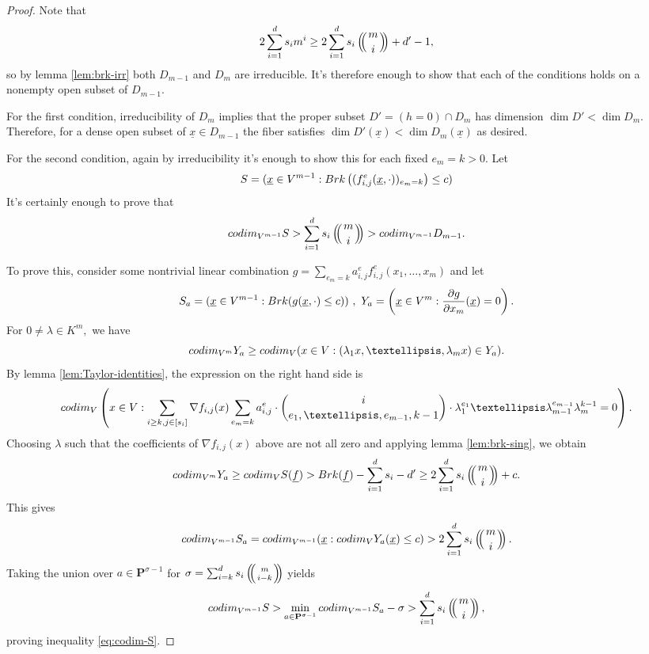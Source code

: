 \documentclass[10pt,a4paper]{amsart}
\let\ul\underline
\theoremstyle{definition}
\def\multiset#1#2{\ensuremath{\left(\kern-.3em\left(\genfrac{}{}{0pt}{}{#1}{#2}\right)\kern-.3em\right)}}
\renewcommand{\P}{\mathbf{P}}
\newcommand{\codim}{\textnormal{codim}}
\newcommand{\brk}{\textnormal{Brk}}
\begin{document}
\begin{proof}
    Note that 
    \[
    2\sum_{i=1}^d s_i m^i \ge 2\sum_{i=1}^d s_i\multiset{m}{i} + d'-1,
    \]
    so by lemma \ref{lem:brk-irr} both $D_{m-1}$ and $D_m$ are irreducible. It's therefore enough to show that each of the conditions holds on a nonempty open subset of $D_{m-1}.$
    
    For the first condition, irreducibility of $D_m$ implies that the proper subset $D' = (h = 0)\cap D_m$ has dimension $\dim D' < \dim D_m.$ Therefore, for a dense open subset of $\ul{x}\in D_{m-1}$ the fiber satisfies $\dim D'(\ul{x}) <\dim D_m(\ul{x})$ as desired. 
    
    For the second condition, again by irreducibility it's enough to show this for each fixed $e_m = k>0.$ Let 
    \[
    S = (\ul{x}\in V^{m-1}: \brk \left((f_{i,j}^e(\ul{x},\cdot))_{e_m = k} \right) \le c)
    \]
    It's certainly enough to prove that
    \begin{equation}\label{eq:codim-S}
        \codim_{V^{m-1}} S > \sum_{i=1}^d s_i \multiset{m}{i} > \codim_{V^{m-1}} D_{m-1}.
    \end{equation}
    
    To prove this, consider some nontrivial linear combination $g = \sum_{e_m = k} a_{i,j}^e f_{i,j}^e(x_1,\ldots,x_m)$ and let
    $$S_a = (\ul{x}\in V^{m-1}: \brk(g(\ul{x},\cdot) \le c))\ ,\ Y_a = \left( \ul{x}\in V^m : \frac{\partial g}{\partial x_m} (\ul{x}) = 0 \right).$$
    For $ 0 \neq \lambda\in K^m,$ we have
    \[
    \codim_{V^m} Y_a \ge \codim_V (x\in V:(\lambda_1x,\ldots,\lambda_m x) \in Y_a). 
    \]
    By lemma \ref{lem:Taylor-identities}, the expression on the right hand side is
    \[
    \codim_V \left( x\in V:  \sum_{i\ge k,j\in [s_i]} \nabla f_{i,j}(x) \sum_{e_m = k} a_{i,j}^e \cdot \binom{i}{e_1,\ldots,e_{m-1},k-1} \cdot \lambda_1^{e_1}\ldots \lambda_{m-1}^{e_{m-1}} \lambda_m^{k-1}  = 0 \right).
    \]
    Choosing $\lambda$ such that the coefficients of  $\nabla f_{i,j}(x)$ above are not all zero and applying lemma \ref{lem:brk-sing}, we obtain  
    \[
    \codim_{V^m} Y_a \ge \codim_V S(\ul{f}) > \brk(\ul{f}) -\sum_{i=1}^d s_i-d' \ge 2\sum_{i=1}^d s_i\multiset{m}{i} +c .
    \]
    This gives  
    \[
    \codim_{V^{m-1}} S_a = \codim_{V^{m-1}} (\ul{x}: \codim_V Y_a(\ul{x}) \le c) > 2\sum_{i=1}^d s_i \multiset{m}{i}.
    \]
    Taking the union over $a\in \P^{\sigma-1}$ for
    $\sigma = \sum_{i=k}^d s_i \multiset{m}{i-k}$ yields 
    \[
    \codim_{V^{m-1}} S > \min_{a\in \P^{\sigma-1}} \codim_{V^{m-1}} S_a - \sigma >  \sum_{i=1}^d s_i \multiset{m}{i},  
    \]
    proving inequality \eqref{eq:codim-S}.
\end{proof}
\end{document}
